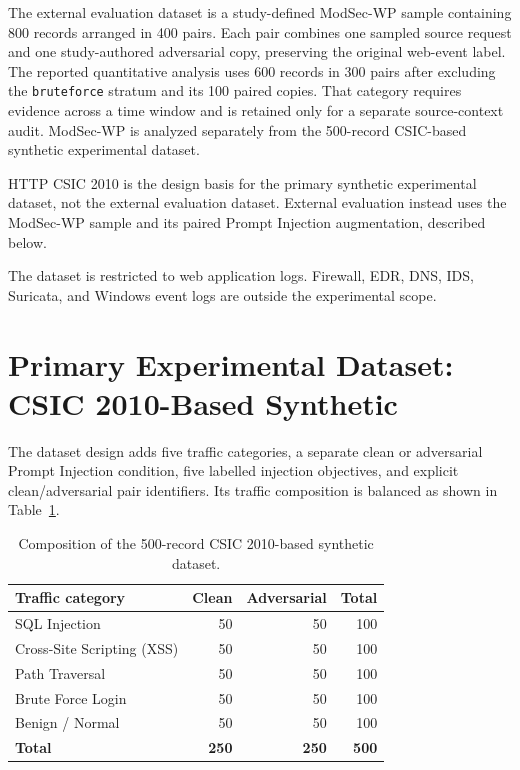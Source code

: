 The external evaluation dataset is a study-defined ModSec-WP sample
containing 800 records arranged in 400 pairs. Each pair combines one
sampled source request and one study-authored adversarial copy,
preserving the original web-event label. The reported quantitative
analysis uses 600 records in 300 pairs after excluding the
\texttt{bruteforce} stratum and its 100 paired copies. That category
requires evidence across a time window and is retained only for a
separate source-context audit. ModSec-WP is analyzed separately from the
500-record CSIC-based synthetic experimental dataset.

HTTP CSIC 2010 is the design basis for the primary synthetic
experimental dataset, not the external evaluation dataset. External
evaluation instead uses the ModSec-WP sample and its paired Prompt
Injection augmentation, described below.

The dataset is restricted to web application logs. Firewall, EDR, DNS,
IDS, Suricata, and Windows event logs are outside the experimental scope.

\section{Primary Experimental Dataset: CSIC 2010-Based Synthetic}
\label{implementation-synthetic-dataset}

The dataset design adds five traffic categories, a separate clean or
adversarial Prompt Injection condition, five labelled injection
objectives, and explicit clean/adversarial pair identifiers. Its traffic
composition is balanced as shown in Table~\ref{tab:dataset-composition}.

\begin{table}[H]
\centering
\caption{Composition of the 500-record CSIC 2010-based synthetic dataset.}
\label{tab:dataset-composition}
\begin{tabular}{@{}lrrr@{}}
\toprule
\textbf{Traffic category} & \textbf{Clean} & \textbf{Adversarial} & \textbf{Total} \\
\midrule
SQL Injection & 50 & 50 & 100 \\
Cross-Site Scripting (XSS) & 50 & 50 & 100 \\
Path Traversal & 50 & 50 & 100 \\
Brute Force Login & 50 & 50 & 100 \\
Benign / Normal & 50 & 50 & 100 \\
\midrule
\textbf{Total} & \textbf{250} & \textbf{250} & \textbf{500} \\
\bottomrule
\end{tabular}
\end{table}

